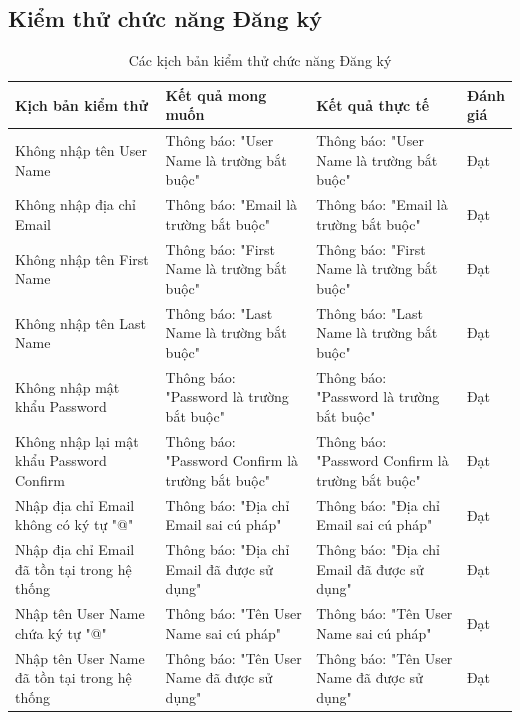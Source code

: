 \documentclass[../DoAn.tex]{subfiles}
\begin{document}
\subsection{Kiểm thử chức năng Đăng ký}
\label{subsection:4.4.1}

\begin{table}[H]
    \renewcommand{\arraystretch}{1.2}
    \centering{}
    \begin{tabular}{p{0.3\linewidth}p{0.3\linewidth}p{0.3\linewidth}p{0.1\linewidth}}
        \hline
        \textbf{Kịch bản kiểm thử}                   & \textbf{Kết quả mong muốn}                       & \textbf{Kết quả thực tế}                         & \textbf{Đánh giá} \\ \hline
        Không nhập tên User Name                     & Thông báo: "User Name là trường bắt buộc"        & Thông báo: "User Name là trường bắt buộc"        & Đạt               \\ \hline
        Không nhập địa chỉ Email                     & Thông báo: "Email là trường bắt buộc"            & Thông báo: "Email là trường bắt buộc"            & Đạt               \\ \hline
        Không nhập tên First Name                    & Thông báo: "First Name là trường bắt buộc"       & Thông báo: "First Name là trường bắt buộc"       & Đạt               \\ \hline
        Không nhập tên Last Name                     & Thông báo: "Last Name là trường bắt buộc"        & Thông báo: "Last Name là trường bắt buộc"        & Đạt               \\ \hline
        Không nhập mật khẩu Password                 & Thông báo: "Password là trường bắt buộc"         & Thông báo: "Password là trường bắt buộc"         & Đạt               \\ \hline
        Không nhập lại mật khẩu Password Confirm     & Thông báo: "Password Confirm là trường bắt buộc" & Thông báo: "Password Confirm là trường bắt buộc" & Đạt               \\ \hline
        Nhập địa chỉ Email không có ký tự "@"        & Thông báo: "Địa chỉ Email sai cú pháp"           & Thông báo: "Địa chỉ Email sai cú pháp"           & Đạt               \\ \hline
        Nhập địa chỉ Email đã tồn tại trong hệ thống & Thông báo: "Địa chỉ Email đã được sử dụng"       & Thông báo: "Địa chỉ Email đã được sử dụng"       & Đạt               \\ \hline
        Nhập tên User Name chứa ký tự "@"            & Thông báo: "Tên User Name sai cú pháp"           & Thông báo: "Tên User Name sai cú pháp"           & Đạt               \\ \hline
        Nhập tên User Name đã tồn tại trong hệ thống & Thông báo: "Tên User Name đã được sử dụng"       & Thông báo: "Tên User Name đã được sử dụng"       & Đạt               \\ \hline
    \end{tabular}
    \renewcommand{\arraystretch}{1}
    \caption{Các kịch bản kiểm thử chức năng Đăng ký}
    \label{fig:testcase_register}
\end{table}
\end{document}
